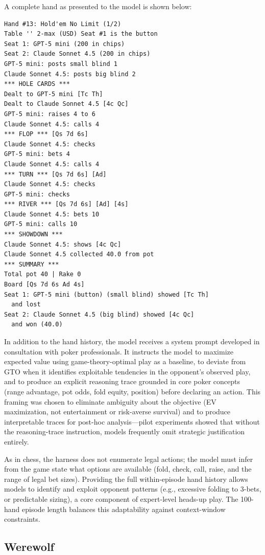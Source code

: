 \documentclass{article}
\begin{document}
A complete hand as presented to the model is shown below:

\begin{verbatim}
Hand #13: Hold'em No Limit (1/2)
Table '' 2-max (USD) Seat #1 is the button
Seat 1: GPT-5 mini (200 in chips)
Seat 2: Claude Sonnet 4.5 (200 in chips)
GPT-5 mini: posts small blind 1
Claude Sonnet 4.5: posts big blind 2
*** HOLE CARDS ***
Dealt to GPT-5 mini [Tc Th]
Dealt to Claude Sonnet 4.5 [4c Qc]
GPT-5 mini: raises 4 to 6
Claude Sonnet 4.5: calls 4
*** FLOP *** [Qs 7d 6s]
Claude Sonnet 4.5: checks
GPT-5 mini: bets 4
Claude Sonnet 4.5: calls 4
*** TURN *** [Qs 7d 6s] [Ad]
Claude Sonnet 4.5: checks
GPT-5 mini: checks
*** RIVER *** [Qs 7d 6s] [Ad] [4s]
Claude Sonnet 4.5: bets 10
GPT-5 mini: calls 10
*** SHOWDOWN ***
Claude Sonnet 4.5: shows [4c Qc]
Claude Sonnet 4.5 collected 40.0 from pot
*** SUMMARY ***
Total pot 40 | Rake 0
Board [Qs 7d 6s Ad 4s]
Seat 1: GPT-5 mini (button) (small blind) showed [Tc Th]
  and lost
Seat 2: Claude Sonnet 4.5 (big blind) showed [4c Qc]
  and won (40.0)
\end{verbatim}


In addition to the hand history, the model receives a system prompt developed in consultation with poker professionals. It instructs the model to maximize expected value using game-theory-optimal play as a baseline, to deviate from GTO when it identifies exploitable tendencies in the opponent's observed play, and to produce an explicit reasoning trace grounded in core poker concepts (range advantage, pot odds, fold equity, position) before declaring an action. This framing was chosen to eliminate ambiguity about the objective (EV maximization, not entertainment or risk-averse survival) and to produce interpretable traces for post-hoc analysis---pilot experiments showed that without the reasoning-trace instruction, models frequently omit strategic justification entirely.

As in chess, the harness does not enumerate legal actions; the model must infer from the game state what options are available (fold, check, call, raise, and the range of legal bet sizes). Providing the full within-episode hand history allows models to identify and exploit opponent patterns (e.g., excessive folding to 3-bets, or predictable sizing), a core component of expert-level heads-up play. The 100-hand episode length balances this adaptability against context-window constraints.


\subsection{Werewolf}
\label{app:werewolf_prompt}
\end{document}
